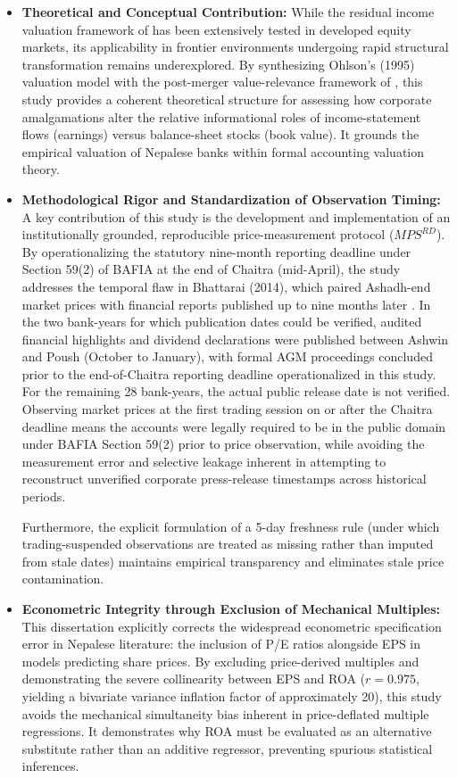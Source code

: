 \begin{itemize}
\item \textbf{Theoretical and Conceptual Contribution:}
While the residual income valuation framework of \citet{ohlson1995} has been extensively tested in developed equity markets, its applicability in frontier environments undergoing rapid structural transformation remains underexplored. By synthesizing Ohlson's (1995) valuation model with the post-merger value-relevance framework of \citet{kwon2020}, this study provides a coherent theoretical structure for assessing how corporate amalgamations alter the relative informational roles of income-statement flows (earnings) versus balance-sheet stocks (book value). It grounds the empirical valuation of Nepalese banks within formal accounting valuation theory.

\item \textbf{Methodological Rigor and Standardization of Observation Timing:}
A key contribution of this study is the development and implementation of an institutionally grounded, reproducible price-measurement protocol ($\mathit{MPS}^{RD}$). By operationalizing the statutory nine-month reporting deadline under Section 59(2) of BAFIA at the end of Chaitra (mid-April), the study addresses the temporal flaw in Bhattarai (2014), which paired Ashadh-end market prices with financial reports published up to nine months later \citep{bhattarai2014}. In the two bank-years for which publication dates could be verified, audited financial highlights and dividend declarations were published between Ashwin and Poush (October to January), with formal AGM proceedings concluded prior to the end-of-Chaitra reporting deadline operationalized in this study. For the remaining 28 bank-years, the actual public release date is not verified. Observing market prices at the first trading session on or after the Chaitra deadline means the accounts were legally required to be in the public domain under BAFIA Section 59(2) prior to price observation, while avoiding the measurement error and selective leakage inherent in attempting to reconstruct unverified corporate press-release timestamps across historical periods.

Furthermore, the explicit formulation of a 5-day freshness rule (under which trading-suspended observations are treated as missing rather than imputed from stale dates) maintains empirical transparency and eliminates stale price contamination.

\item \textbf{Econometric Integrity through Exclusion of Mechanical Multiples:}
This dissertation explicitly corrects the widespread econometric specification error in Nepalese literature: the inclusion of P/E ratios alongside EPS in models predicting share prices. By excluding price-derived multiples and demonstrating the severe collinearity between EPS and ROA ($r = 0.975$, yielding a bivariate variance inflation factor of approximately 20), this study avoids the mechanical simultaneity bias inherent in price-deflated multiple regressions. It demonstrates why ROA must be evaluated as an alternative substitute rather than an additive regressor, preventing spurious statistical inferences.


\end{itemize}
